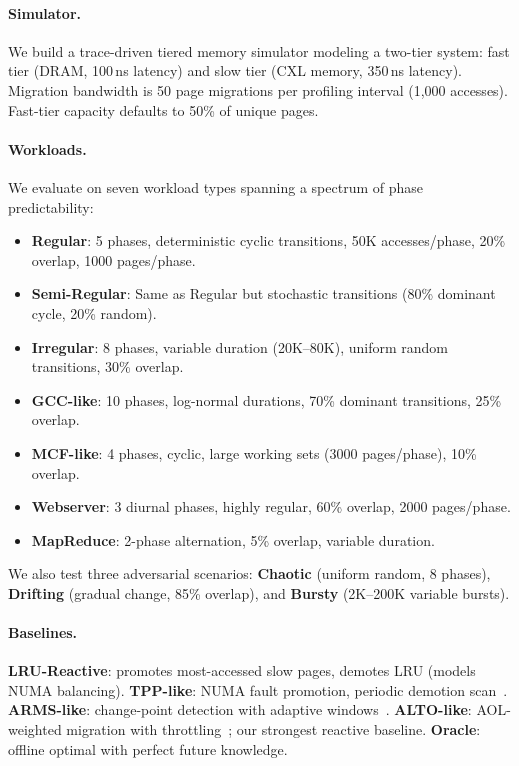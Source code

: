 \documentclass[preprint]{article}
\begin{document}
\paragraph{Simulator.} We build a trace-driven tiered memory simulator modeling a two-tier system: fast tier (DRAM, 100\,ns latency) and slow tier (CXL memory, 350\,ns latency). Migration bandwidth is 50 page migrations per profiling interval (1{,}000 accesses). Fast-tier capacity defaults to 50\% of unique pages.

\paragraph{Workloads.} We evaluate on seven workload types spanning a spectrum of phase predictability:
\begin{itemize}
    \item \textbf{Regular}: 5 phases, deterministic cyclic transitions, 50K accesses/phase, 20\% overlap, 1000 pages/phase.
    \item \textbf{Semi-Regular}: Same as Regular but stochastic transitions (80\% dominant cycle, 20\% random).
    \item \textbf{Irregular}: 8 phases, variable duration (20K--80K), uniform random transitions, 30\% overlap.
    \item \textbf{GCC-like}: 10 phases, log-normal durations, 70\% dominant transitions, 25\% overlap.
    \item \textbf{MCF-like}: 4 phases, cyclic, large working sets (3000 pages/phase), 10\% overlap.
    \item \textbf{Webserver}: 3 diurnal phases, highly regular, 60\% overlap, 2000 pages/phase.
    \item \textbf{MapReduce}: 2-phase alternation, 5\% overlap, variable duration.
\end{itemize}
We also test three adversarial scenarios: \textbf{Chaotic} (uniform random, 8 phases), \textbf{Drifting} (gradual change, 85\% overlap), and \textbf{Bursty} (2K--200K variable bursts).

\paragraph{Baselines.}
\textbf{LRU-Reactive}: promotes most-accessed slow pages, demotes LRU (models NUMA balancing).
\textbf{TPP-like}: NUMA fault promotion, periodic demotion scan~\citep{maruf2023tpp}.
\textbf{ARMS-like}: change-point detection with adaptive windows~\citep{yadalam2025arms}.
\textbf{ALTO-like}: AOL-weighted migration with throttling~\citep{liu2025hotness}; our strongest reactive baseline.
\textbf{Oracle}: offline optimal with perfect future knowledge.
\end{document}
